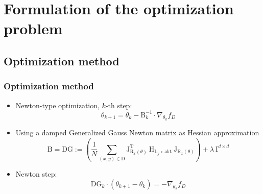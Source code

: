 



\beamertemplatenavigationsymbolsempty{}


\section{Formulation of the optimization problem}

  \subsection{Optimization method}
  \begin{frame}
  \frametitle{Optimization method}
  \begin{itemize}
  	\item Newton-type optimization, $k$-th step: 
  	$$\theta_{k+1} = \theta_{k} - \mathrm{B}_{k}^{-1}\cdot\nabla_{\theta_{k}} f_{D}$$%
  	\pause
  	\item Using a damped Generalized Gauss Newton matrix as Hessian approximation
  	$$\mathrm{B} = \mathrm{DG} := \left(\frac{1}{N}\sum_{(x, y)\in\mathrm{D}}^{}\mathrm{J}_{\mathrm{R}_{x}(\theta)}^{\mathrm{T}}\:\mathrm{H}_{\mathrm{L_{y}\circ\:\text{akt}}}\:\mathrm{J}_{\mathrm{R}_{x}(\theta)}\right) + \lambda\:\mathrm{I}^{d\times d} $$
  	\item[] Newton step:
  	$$\mathrm{DG}_{k}\cdot (\theta_{k+1} - \theta_{k}) = -\nabla_{\theta_{k}}f_{D}$$
  \end{itemize}
\end{frame}

